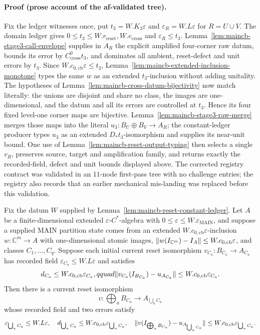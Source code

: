 \paragraph{Proof (prose account of the af-validated tree).}
Fix the ledger witnesses once, put $t_3=W.K_3\varepsilon$ and
$\varepsilon_R=W.L\varepsilon$ for $R=U\cup V$.  The domain ledger gives
$0\le t_3\le W.r_{\mathrm{reset}},W.e_{\mathrm{cross}}$ and
$\varepsilon_R\le t_3$.  Lemma~\ref{lem:maincb-stage3-call-envelope} supplies in $A_R$ the
explicit amplified four-corner raw datum, bounds its error by
$C^0_{\mathrm{cross}}t_3$, and dominates all ambient, reset-defect and unit errors by
$t_3$.  Since $W.c_{0,\mathrm{cb}}\varepsilon\le t_3$, Lemma~\ref{lem:maincb-extended-inclusion-monotone}
types the same $w$ as an extended $t_3$-inclusion without adding unitality.
The hypotheses of Lemma~\ref{lem:maincb-cross-datum-bijectivity} now match literally: the
unions are disjoint and share no class, the images are one-dimensional, and the datum and
all its errors are controlled at $t_3$.  Hence its four fixed level-one corner maps are
bijective.  Lemma~\ref{lem:maincb-stage3-raw-merge} merges those maps into the literal
$u_3:B_U\oplus B_V\to A_R$; the constant-ledger producer types $u_3$ as an extended
$D_*t_3$-isomorphism and supplies its near-unit bound.  One use of
Lemma~\ref{lem:maincb-reset-output-typing} then selects a single $v_R$, preserves source,
target and amplification family, and returns exactly the recorded-field, defect and unit
bounds displayed above.  The corrected registry contract was validated in an $11$-node
first-pass tree with no challenge entries; the registry also records that an earlier
mechanical mis-landing was replaced before this validation.
\begin{lemma}\label{lem:maincb-stage3-finite-recombination}
Fix the datum $W$ supplied by Lemma~\ref{lem:maincb-reset-constant-ledger}.  Let $A$ be a
finite-dimensional extended $\varepsilon$-$C^*$-algebra with
$0\le\varepsilon\le W.\varepsilon_{\mathrm{MAIN}}$, and suppose a supplied MAIN partition
state comes from an extended $W.c_{0,\mathrm{cb}}\varepsilon$-inclusion
$w:\mathbb C^m\to A$ with one-dimensional atomic images,
$\lVert w(I_{\mathbb C^m})-I_A\rVert\le W.c_{0,\mathrm{cb}}\varepsilon$, and classes
$C_1,\ldots,C_q$.  Suppose each initial current reset
isomorphism $v_{C_a}:B_{C_a}\to A_{C_a}$ has recorded field
$\varepsilon_{C_a}\le W.L\varepsilon$ and satisfies
\[
 d_{C_a}\le W.c_{0,\mathrm{cb}}\varepsilon_{C_a},qquad
 \lVert v_{C_a}(I_{B_{C_a}})-u_{A_{C_a}}\rVert\le W.c_{0,\mathrm{cb}}\varepsilon_{C_a}.
\]
Then there is a current reset isomorphism
\[
 v:\bigoplus_a B_{C_a}\longrightarrow A_{\bigcup_a C_a}
\]
whose recorded field and two errors satisfy
\[
 \varepsilon_{\bigcup_a C_a}\le W.L\varepsilon,\quad d_{\bigcup_a C_a}\le W.c_{0,\mathrm{cb}}\varepsilon_{\bigcup_a C_a},\quad \lVert v(I_{\bigoplus_aB_{C_a}})-u_{A_{\bigcup_aC_a}}\rVert\le W.c_{0,\mathrm{cb}}\varepsilon_{\bigcup_a C_a}.
\]
\end{lemma}
